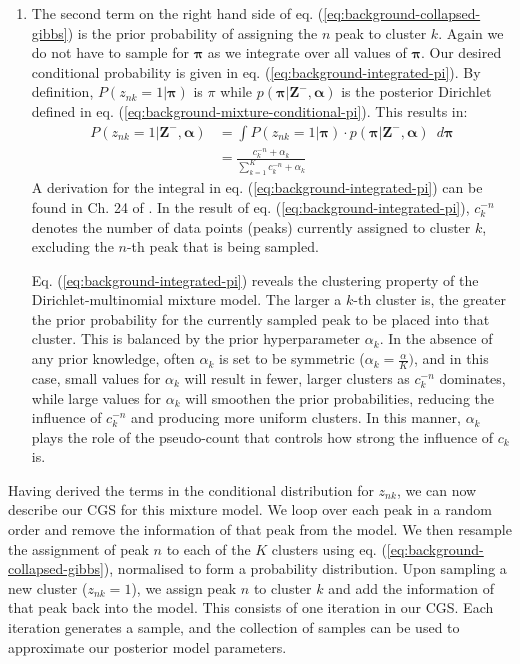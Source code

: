 \begin{enumerate}
\item The second term on the right hand side of eq. (\ref{eq:background-collapsed-gibbs}) is the prior probability of assigning the $n$ peak to cluster $k$. Again we do not have to sample for $\boldsymbol{\pi}$ as we integrate over all values of $\boldsymbol{\pi}$. Our desired conditional probability is given in eq. (\ref{eq:background-integrated-pi}). By definition, $P(z_{nk}=1 \vert \boldsymbol{\pi})$ is $\pi$ while $p(\boldsymbol{\pi} \vert \boldsymbol{Z}^{-}, \boldsymbol{\alpha})$ is the posterior Dirichlet defined in eq. (\ref{eq:background-mixture-conditional-pi}). This results in:
\begin{equation}
\begin{aligned}
P(z_{nk}=1 \vert \boldsymbol{Z}^{-}, \boldsymbol{\alpha}) &= \int P(z_{nk}=1 \vert \boldsymbol{\pi}) \cdot p(\boldsymbol{\pi} \vert \boldsymbol{Z}^{-}, \boldsymbol{\alpha}) \enspace d\boldsymbol{\pi} \\
                                                                                         &= \frac{c_k^{-n} + \alpha_k}{\sum_{k=1}^K c_k^{-n} + \alpha_k}
\label{eq:background-integrated-pi}
\end{aligned}
\end{equation}
A derivation for the integral in eq. (\ref{eq:background-integrated-pi}) can be found in Ch. 24 of \cite{murphy2012machine}. In the result of eq. (\ref{eq:background-integrated-pi}), $c_k^{-n}$ denotes the number of data points (peaks) currently assigned to cluster $k$, excluding the $n$-th peak that is being sampled. 

Eq. (\ref{eq:background-integrated-pi}) reveals the clustering property of the Dirichlet-multinomial mixture model. The larger a $k$-th cluster is, the greater the prior probability for the currently sampled peak to be placed into that cluster. This is balanced by the prior hyperparameter $\alpha_k$. In the absence of any prior knowledge, often $\alpha_k$ is set to be symmetric ($\alpha_k=\frac{\alpha}{K})$, and in this case, small values for $\alpha_k$ will result in fewer, larger clusters as $c_k^{-n}$ dominates, while large values for $\alpha_k$ will smoothen the prior probabilities, reducing the influence of $c_k^{-n}$ and producing more uniform clusters. In this manner, $\alpha_k$ plays the role of the pseudo-count that controls how strong the influence of $c_k$ is. 
\end{enumerate}

Having derived the terms in the conditional distribution for $z_{nk}$, we can now describe our CGS for this mixture model. We loop over each peak in a random order and remove the information of that peak from the model. We then resample the assignment of peak $n$ to each of the $K$ clusters using eq. (\ref{eq:background-collapsed-gibbs}), normalised to form a probability distribution. Upon sampling a new cluster ($z_{nk}=1$), we assign peak $n$ to cluster $k$ and add the information of that peak back into the model. This consists of one iteration in our CGS. Each iteration generates a sample, and the collection of samples can be used to approximate our posterior model parameters.

